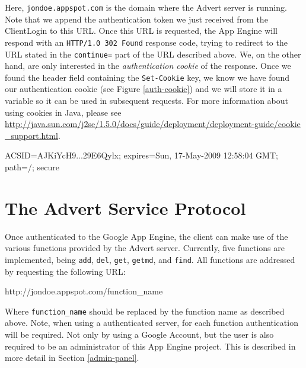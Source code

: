 \documentclass[a4paper,10pt]{article}
\begin{document}
Here, \texttt{jondoe.appspot.com} is the domain where the Advert server is
running. Note that we append the authentication token we just received from the
ClientLogin to this URL. Once this URL is requested, the App Engine will
respond with an \texttt{HTTP/1.0 302 Found} response code, trying to redirect
to the URL stated in the \texttt{continue=} part of the URL described above.
We, on the other hand, are only interested in the \emph{authentication cookie}
of the response. Once we found the header field containing the
\texttt{Set-Cookie} key, we know we have found our authentication cookie (see
Figure \ref{auth-cookie}) and we will store it in a variable so it can be used
in subsequent requests. For more information about using cookies in Java,
please see
\url{
http://java.sun.com/j2se/1.5.0/docs/guide/deployment/deployment-guide/cookie
\_support.html}.

\begin{figure*}[ht] %
\begin{center}
\begin{code}
ACSID=AJKiYcH9...29E6Qylx; expires=Sun, 17-May-2009 12:58:04 GMT;
    path=/; secure
\end{code}
\caption{Authentication Cookie.\label{auth-cookie}}
\end{center}
\end{figure*}

\section{The Advert Service Protocol}
\label{protocol}
Once authenticated to the Google App Engine, the client can make use of the
various functions provided by the Advert server. Currently, five functions are
implemented, being \texttt{add}, \texttt{del}, \texttt{get}, \texttt{getmd},
and \texttt{find}. All functions are addressed by requesting the following URL:

\begin{center}
\begin{code}
http://jondoe.appspot.com/function_name
\end{code}
\end{center}

Where \texttt{function\_name} should be replaced by the function name as
described above. Note, when using a authenticated server, for each function
authentication will be required. Not only by using a Google Account, but
the user is also required to be an administrator of this App Engine project.
This
is described in more detail in Section \ref{admin-panel}.
\end{document}
